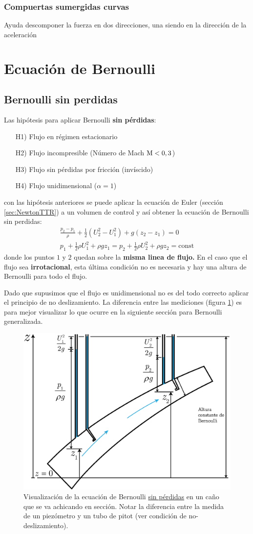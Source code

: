 \subsubsection*{Compuertas sumergidas curvas}
Ayuda descomponer la fuerza en dos direcciones, una siendo en la dirección de la aceleración

\section{Ecuación de Bernoulli}
\subsection{Bernoulli sin perdidas}
Las hipótesis para aplicar Bernoulli \textbf{sin pérdidas}:
\begin{itemize}
    \item[H1)] Flujo en régimen estacionario
    \item[H2)] Flujo incompresible (Número de Mach $\textrm{M}<0,3$)
    \item[H3)] Flujo sin pérdidas por fricción (invíscido)
    \item[H4)] Flujo unidimensional ($\alpha=1$)
\end{itemize}
con las hipótesis anteriores se puede aplicar la ecuación de Euler (sección \ref{sec:NewtonTTR}) a un volumen de control y así obtener la ecuación de Bernoulli sin perdidas:
\begin{gather*}
    \frac{p_2-p_1}{\rho}+\tfrac{1}{2}(U_2^2-U_1^2)+g(z_2-z_1)=0\\
    p_1+\tfrac{1}{2}\rho U_1^2+\rho gz_1=p_2+\tfrac{1}{2}\rho U_2^2+\rho g z_2=\textrm{const}
\end{gather*}
donde los puntos $1$ y $2$ quedan sobre la \textbf{misma linea de flujo.} En el caso que el flujo sea \textbf{irrotacional}, esta última condición no es necesaria y hay una altura de Bernoulli para todo el flujo.

Dado que supusimos que el flujo es unidimensional no es del todo correcto aplicar el principio de no deslizamiento. La diferencia entre las mediciones (figura \ref{fig:diagramaBernoulli}) es para mejor visualizar lo que ocurre en la siguiente sección para Bernoulli generalizada. 

\begin{figure}
    \centering
    \includegraphics[width=.5\textwidth]{fig/bernoullidiag.eps}
    \caption{Visualización de la ecuación de Bernoulli \underline{sin pérdidas} en un caño que se va achicando en sección. Notar la diferencia entre la medida de un piezómetro y un tubo de pitot (ver condición de no-deslizamiento).}
    \label{fig:diagramaBernoulli}
\end{figure}
